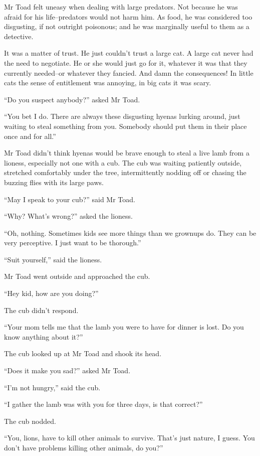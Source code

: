 \documentclass{memoir}
\begin{document}
Mr Toad felt uneasy when dealing with large predators. Not because he was afraid for his life--predators would not harm him. As food, he was considered too disgusting, if not outright poisonous; and he was marginally useful to them as a detective. 

It was a matter of trust. He just couldn't trust a large cat. A large cat never had the need to negotiate. He or she would just go for it, whatever it was that they currently needed--or whatever they fancied. And damn the consequences! In little cats the sense of entitlement was annoying, in big cats it was scary.

``Do you suspect anybody?'' asked Mr Toad.

``You bet I do. There are always these disgusting hyenas lurking around, just waiting to steal something from you. Somebody should put them in their place once and for all.''

Mr Toad didn't think hyenas would be brave enough to steal a live lamb from a lioness, especially not one with a cub. The cub was waiting patiently outside, stretched comfortably under the tree, intermittently nodding off or chasing the buzzing flies with its large paws. 

``May I speak to your cub?'' said Mr Toad.

``Why? What's wrong?'' asked the lioness.

``Oh, nothing. Sometimes kids see more things than we grownups do. They can be very perceptive. I just want to be thorough.''

``Suit yourself,'' said the lioness.

Mr Toad went outside and approached the cub.

``Hey kid, how are you doing?''

The cub didn't respond.

``Your mom tells me that the lamb you were to have for dinner is lost. Do you know anything about it?''

The cub looked up at Mr Toad and shook its head.

``Does it make you sad?'' asked Mr Toad.

``I'm not hungry,'' said the cub.

``I gather the lamb was with you for three days, is that correct?''

The cub nodded.

``You, lions, have to kill other animals to survive. That's just nature, I guess. You don't have problems killing other animals, do you?''
\end{document}
